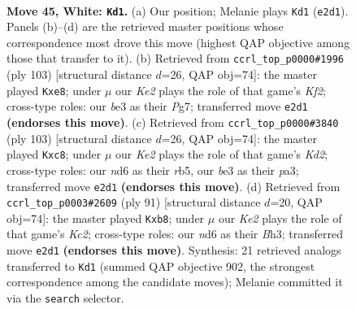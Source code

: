\documentclass[11pt]{article}
\begin{document}
\clearpage

\begin{figure}[p]\centering
\begin{subfigure}{0.46\textwidth}\centering
\resizebox{\linewidth}{!}{%
\newchessgame
\chessboard[
  setfen={4k3/8/3n4/8/1p6/1P2b3/4Kq2/8 w - - 10 45},
  showmover=false,
  pgfstyle=straightmove, color=movearrow, markmove={e2-d1}
]}
\caption{}
\end{subfigure}\hfill
\begin{subfigure}{0.46\textwidth}\centering
\resizebox{\linewidth}{!}{%
\newchessgame
\chessboard[
  setfen={4Q3/5kp1/8/8/p1N2p2/8/1K6/8 b - - 0 52},
  showmover=false,
  pgfstyle=straightmove, color=movearrow, markmove={f7-e8}
]}
\caption{}
\end{subfigure}
\\[4pt]
\begin{subfigure}{0.46\textwidth}\centering
\resizebox{\linewidth}{!}{%
\newchessgame
\chessboard[
  setfen={2Q5/3k4/8/1R4p1/8/P7/1K6/7r b - - 0 52},
  showmover=false,
  pgfstyle=straightmove, color=movearrow, markmove={d7-c8}
]}
\caption{}
\end{subfigure}\hfill
\begin{subfigure}{0.46\textwidth}\centering
\resizebox{\linewidth}{!}{%
\newchessgame
\chessboard[
  setfen={1Q2B3/2k5/3p4/8/3p4/7b/5K2/8 b - - 0 46},
  showmover=false,
  pgfstyle=straightmove, color=movearrow, markmove={c7-b8}
]}
\caption{}
\end{subfigure}
\caption{\textbf{Move 45, White: \texttt{Kd1}.} (a) Our position; Melanie plays \texttt{Kd1} (\texttt{e2d1}). Panels (b)--(d) are the retrieved master positions whose correspondence most drove this move (highest QAP objective among those that transfer to it). (b) Retrieved from \texttt{ccrl\_top\_p0000\#1996} (ply 103) [structural distance $d$=26, QAP obj=74]: the master played \texttt{Kxe8}; under $\mu$ our \emph{Ke2} plays the role of that game's \emph{Kf2}; cross-type roles: our \emph{b}e3 as their \emph{P}g7; transferred move \texttt{e2d1} \textbf{(endorses this move)}. (c) Retrieved from \texttt{ccrl\_top\_p0000\#3840} (ply 103) [structural distance $d$=26, QAP obj=74]: the master played \texttt{Kxc8}; under $\mu$ our \emph{Ke2} plays the role of that game's \emph{Kd2}; cross-type roles: our \emph{n}d6 as their \emph{r}b5, our \emph{b}e3 as their \emph{p}a3; transferred move \texttt{e2d1} \textbf{(endorses this move)}. (d) Retrieved from \texttt{ccrl\_top\_p0003\#2609} (ply 91) [structural distance $d$=20, QAP obj=74]: the master played \texttt{Kxb8}; under $\mu$ our \emph{Ke2} plays the role of that game's \emph{Kc2}; cross-type roles: our \emph{n}d6 as their \emph{B}h3; transferred move \texttt{e2d1} \textbf{(endorses this move)}. Synthesis: 21 retrieved analogs transferred to \texttt{Kd1} (summed QAP objective 902, the strongest correspondence among the candidate moves); Melanie committed it via the \texttt{search} selector.}
\label{fig:thought-m88}
\end{figure}
\end{document}
